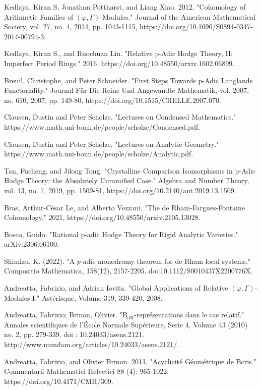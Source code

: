 \documentclass[12pt]{book}
\theoremstyle{definition}
\begin{document}
\begin{thebibliography}{10}
 Kedlaya, Kiran S, Jonathan Pottharst, and Liang Xiao. 2012. "Cohomology of Arithmetic Families of $(\varphi,\Gamma)$-Modules." Journal of the American Mathematical Society, vol. 27, no. 4, 2014, pp. 1043-1115, https://doi.org/10.1090/S0894-0347-2014-00794-3.
 
 Kedlaya, Kiran S., and Ruochuan Liu. "Relative p-Adic Hodge Theory, II: Imperfect Period Rings." 2016, https://doi.org/10.48550/arxiv.1602.06899.

 Breuil, Christophe, and Peter Schneider. "First Steps Towards p-Adic Langlands Functoriality." Journal F\"ur Die Reine Und Angewandte Mathematik, vol. 2007, no. 610, 2007, pp. 149-80, https://doi.org/10.1515/CRELLE.2007.070.

 Clausen, Dustin and Peter Scholze. "Lectures on Condensed Mathematics." https://www.math.uni-bonn.de/people/scholze/Condensed.pdf.

 Clausen, Dustin and Peter Scholze. "Lectures on Analytic Geometry." https://www.math.uni-bonn.de/people/scholze/Analytic.pdf.

 Tan, Fucheng, and Jilong Tong. "Crystalline Comparison Isomorphisms in p-Adic Hodge Theory: the Absolutely Unramified Case." Algebra and Number Theory, vol. 13, no. 7, 2019, pp. 1509-81, https://doi.org/10.2140/ant.2019.13.1509.

 Bras, Arthur-C\'esar Le, and Alberto Vezzani. "The de Rham-Fargues-Fontaine Cohomology." 2021, https://doi.org/10.48550/arxiv.2105.13028.

 Bosco, Guido. "Rational p-adic Hodge Theory for Rigid Analytic Varieties." arXiv:2306.06100. 

 Shimizu, K. (2022). "A $p$-adic monodromy theorem for de Rham local systems." Compositio Mathematica, 158(12), 2157-2205. doi:10.1112/S0010437X2200776X.

 Andreatta, Fabrizio, and Adrian Iovita. "Global Applications of Relative $(\varphi,\Gamma)$-Modules I." Ast\'erisque, Volume 319, 339-420, 2008.

 Andreatta, Fabrizio; Brinon, Olivier. "$\mathrm {B}_{\mathrm {dR}}$-repr\'esentations dans le cas relatif." Annales scientifiques de l'\'Ecole Normale Sup\'erieure, Serie 4, Volume 43 (2010) no. 2, pp. 279-339. doi : 10.24033/asens.2121. http://www.numdam.org/articles/10.24033/asens.2121/.

 Andreatta, Fabrizio, and Olivier Brinon. 2013. "Acyclicit\'e G\'eom\'etrique de Bcris." Commentarii Mathematici Helvetici 88 (4): 965-1022. https://doi.org/10.4171/CMH/309.


\end{thebibliography}
\end{document}
